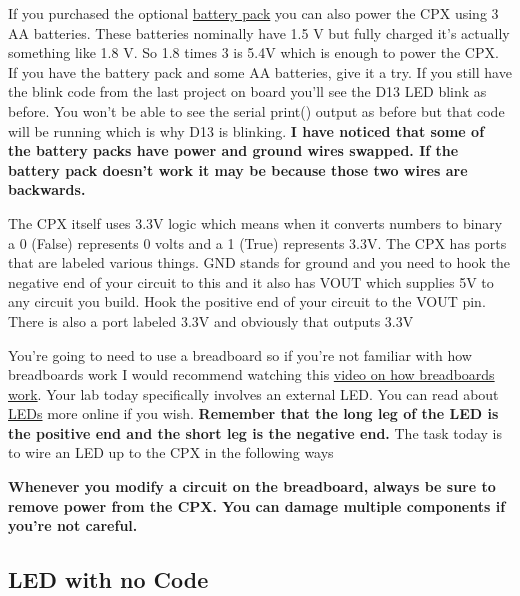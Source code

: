 If you purchased the optional
\href{https://www.adafruit.com/product/3287}{battery pack} you can
also power the CPX using 3 AA batteries. These batteries nominally
have 1.5 V but fully 
charged it's actually something like 1.8 V. So 1.8 times 3 is 5.4V
which is enough to power the CPX. If you have the battery pack and
some AA batteries, give it a try. If you still have the blink code
from the last project on board you’ll see the D13 LED blink as
before. You won’t be able to see the serial print() output as before
but that code will be running which is why D13 is blinking. {\bf I have
noticed that some of the battery packs have power and ground wires
swapped. If the battery pack doesn’t work it may be because those two
wires are backwards.}

The CPX itself uses 3.3V logic which means when it converts numbers to
binary a 0 (False) represents 0 volts and a 1 (True) represents
3.3V. The CPX has ports that are labeled various things. GND stands
for ground and you need to hook the negative end of your circuit to
this and it also has VOUT which supplies 5V to any circuit you
build. Hook the positive end of your circuit to the VOUT pin. There is
also a port labeled 3.3V and obviously that outputs 3.3V

You’re going to need to use a breadboard so if you’re not familiar
with how breadboards work I would recommend watching this \href{https://www.youtube.com/watch?v=mE33WpRWrXs}{video on how
breadboards work}. Your lab today specifically involves an external
LED. You can read about
\href{https://learn.sparkfun.com/tutorials/light-emitting-diodes-leds/}{LEDs}
more online if you wish. {\bf Remember that the long leg of the LED is 
the positive end and the short leg is the negative end.} The task today
is to wire an LED up to the CPX in the following ways

{\bf Whenever you modify a circuit on the breadboard, always be sure
  to remove power from the CPX. You can damage multiple components if
  you’re not careful.}

\subsection{LED with no Code}

